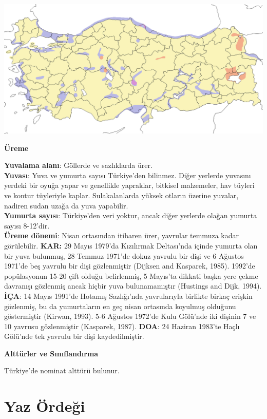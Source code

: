 \documentclass[
  a4paper,
  DIV=11,
  numbers=noendperiod]{scrartcl}
\begin{document}
\includegraphics{images/harita_Anas crecca.png}

\textbf{Üreme}

\textbf{Yuvalama alanı}: Göllerde ve sazlıklarda ürer.\\
\textbf{Yuvası}: Yuva ve yumurta sayısı Türkiye'den bilinmez. Diğer
yerlerde yuvasını yerdeki bir oyuğa yapar ve genellikle yapraklar,
bitkisel malzemeler, hav tüyleri ve kontur tüyleriyle kaplar.
Sulakalanlarda yüksek otların üzerine yuvalar, nadiren sudan uzağa da
yuva yapabilir.\\
\textbf{Yumurta sayısı}: Türkiye'den veri yoktur, ancak diğer yerlerde
olağan yumurta sayısı 8-12'dir.\\
\textbf{Üreme dönemi}: Nisan ortasından itibaren ürer, yavrular temmuza
kadar görülebilir. \textbf{KAR:} 29 Mayıs 1979'da Kızılırmak Deltası'nda
içinde yumurta olan bir yuva bulunmuş, 28 Temmuz 1971'de dokuz yavrulu
bir dişi ve 6 Ağustos 1971'de beş yavrulu bir dişi gözlenmiştir (Dijksen
and Kasparek, 1985). 1992'de popülasyonun 15-20 çift olduğu belirlenmiş,
5 Mayıs'ta dikkati başka yere çekme davranışı gözlenmiş ancak hiçbir
yuva bulunamamıştır (Hustings and Dijk, 1994). \textbf{İÇA}: 14 Mayıs
1991'de Hotamış Sazlığı'nda yavrularıyla birlikte birkaç erişkin
gözlenmiş, bu da yumurtaların en geç nisan ortasında koyulmuş olduğunu
göstermiştir (Kirwan, 1993). 5-6 Ağustos 1972'de Kulu Gölü'nde iki
dişinin 7 ve 10 yavrusu gözlenmiştir (Kasparek, 1987). \textbf{DOA}: 24
Haziran 1983'te Haçlı Gölü'nde tek yavrulu bir dişi kaydedilmiştir.

\textbf{Alttürler ve Sınıflandırma}

Türkiye'de nominat alttürü bulunur.

\section{Yaz Ördeği}\label{yaz-uxf6rdeux11fi}
\end{document}
